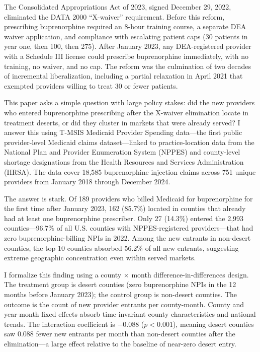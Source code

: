 \documentclass[12pt]{article}
\begin{document}
The Consolidated Appropriations Act of 2023, signed December 29, 2022, eliminated the DATA 2000 ``X-waiver'' requirement. Before this reform, prescribing buprenorphine required an 8-hour training course, a separate DEA waiver application, and compliance with escalating patient caps (30 patients in year one, then 100, then 275). After January 2023, any DEA-registered provider with a Schedule III license could prescribe buprenorphine immediately, with no training, no waiver, and no cap. The reform was the culmination of two decades of incremental liberalization, including a partial relaxation in April 2021 that exempted providers willing to treat 30 or fewer patients.

This paper asks a simple question with large policy stakes: did the new providers who entered buprenorphine prescribing after the X-waiver elimination locate in treatment deserts, or did they cluster in markets that were already served? I answer this using T-MSIS Medicaid Provider Spending data---the first public provider-level Medicaid claims dataset---linked to practice-location data from the National Plan and Provider Enumeration System (NPPES) and county-level shortage designations from the Health Resources and Services Administration (HRSA). The data cover 18,585 buprenorphine injection claims across 751 unique providers from January 2018 through December 2024.

The answer is stark. Of 189 providers who billed Medicaid for buprenorphine for the first time after January 2023, 162 (85.7\%) located in counties that already had at least one buprenorphine prescriber. Only 27 (14.3\%) entered the 2,993 counties---96.7\% of all U.S. counties with NPPES-registered providers---that had zero buprenorphine-billing NPIs in 2022. Among the new entrants in non-desert counties, the top 10 counties absorbed 56.2\% of all new entrants, suggesting extreme geographic concentration even within served markets.

I formalize this finding using a county $\times$ month difference-in-differences design. The treatment group is desert counties (zero buprenorphine NPIs in the 12 months before January 2023); the control group is non-desert counties. The outcome is the count of new provider entrants per county-month. County and year-month fixed effects absorb time-invariant county characteristics and national trends. The interaction coefficient is $-0.088$ ($p < 0.001$), meaning desert counties saw 0.088 fewer new entrants per month than non-desert counties after the elimination---a large effect relative to the baseline of near-zero desert entry.
\end{document}
